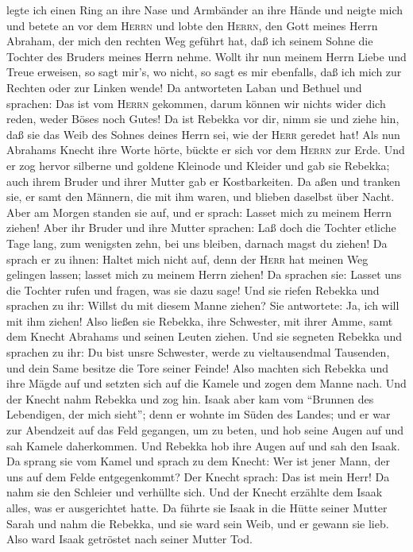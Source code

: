 legte ich einen Ring an ihre Nase und Armbänder an ihre Hände
 und neigte mich und betete an vor dem \textsc{Herrn} und
lobte den \textsc{Herrn}, den Gott meines Herrn Abraham, der mich den
rechten Weg geführt hat, daß ich seinem Sohne die Tochter des Bruders
meines Herrn nehme.  Wollt ihr nun meinem Herrn Liebe und
Treue erweisen, so sagt mir's, wo nicht, so sagt es mir ebenfalls, daß
ich mich zur Rechten oder zur Linken wende!  Da
antworteten Laban und Bethuel und sprachen: Das ist vom \textsc{Herrn}
gekommen, darum können wir nichts wider dich reden, weder Böses noch
Gutes!  Da ist Rebekka vor dir, nimm sie und ziehe hin,
daß sie das Weib des Sohnes deines Herrn sei, wie der \textsc{Herr}
geredet hat!  Als nun Abrahams Knecht ihre Worte hörte,
bückte er sich vor dem \textsc{Herrn} zur Erde.  Und er
zog hervor silberne und goldene Kleinode und Kleider und gab sie
Rebekka; auch ihrem Bruder und ihrer Mutter gab er Kostbarkeiten.
 Da aßen und tranken sie, er samt den Männern, die mit
ihm waren, und blieben daselbst über Nacht. Aber am Morgen standen sie
auf, und er sprach: Lasset mich zu meinem Herrn ziehen! 
Aber ihr Bruder und ihre Mutter sprachen: Laß doch die Tochter etliche
Tage lang, zum wenigsten zehn, bei uns bleiben, darnach magst du ziehen!
 Da sprach er zu ihnen: Haltet mich nicht auf, denn der
\textsc{Herr} hat meinen Weg gelingen lassen; lasset mich zu meinem
Herrn ziehen!  Da sprachen sie: Lasset uns die Tochter
rufen und fragen, was sie dazu sage!  Und sie riefen
Rebekka und sprachen zu ihr: Willst du mit diesem Manne ziehen? Sie
antwortete: Ja, ich will mit ihm ziehen!  Also ließen sie
Rebekka, ihre Schwester, mit ihrer Amme, samt dem Knecht Abrahams und
seinen Leuten ziehen.  Und sie segneten Rebekka und
sprachen zu ihr: Du bist unsre Schwester, werde zu vieltausendmal
Tausenden, und dein Same besitze die Tore seiner Feinde! 
Also machten sich Rebekka und ihre Mägde auf und setzten sich auf die
Kamele und zogen dem Manne nach. Und der Knecht nahm Rebekka und zog
hin.  Isaak aber kam vom ``Brunnen des Lebendigen, der
mich sieht''; denn er wohnte im Süden des Landes;  und er
war zur Abendzeit auf das Feld gegangen, um zu beten, und hob seine
Augen auf und sah Kamele daherkommen.  Und Rebekka hob
ihre Augen auf und sah den Isaak. Da sprang sie vom Kamel
 und sprach zu dem Knecht: Wer ist jener Mann, der uns
auf dem Felde entgegenkommt? Der Knecht sprach: Das ist mein Herr! Da
nahm sie den Schleier und verhüllte sich.  Und der Knecht
erzählte dem Isaak alles, was er ausgerichtet hatte.  Da
führte sie Isaak in die Hütte seiner Mutter Sarah und nahm die Rebekka,
und sie ward sein Weib, und er gewann sie lieb. Also ward Isaak
getröstet nach seiner Mutter Tod.

